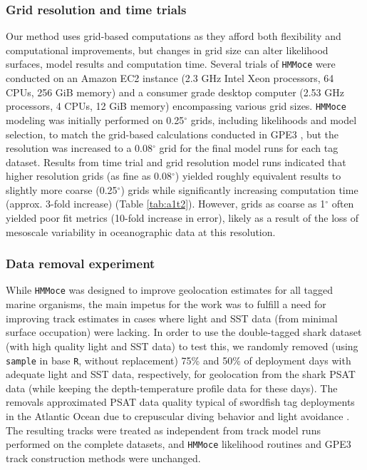 \subsubsection{Grid resolution and time
trials}%

Our method uses grid-based computations as they afford both flexibility and computational improvements, but changes in grid size can alter likelihood surfaces, model results and computation time. Several trials of \texttt{HMMoce} were conducted on an Amazon EC2 instance (2.3 GHz Intel Xeon processors, 64 CPUs, 256 GiB memory) and a consumer grade desktop computer (2.53 GHz processors, 4 CPUs, 12 GiB memory) encompassing various grid sizes. \texttt{HMMoce} modeling was initially performed on 0.25$^{\circ}$ grids, including likelihoods and model selection, to match the grid-based calculations conducted in GPE3 \citep{WC2015}, but the resolution was increased to a 0.08$^{\circ}$ grid for the final model runs for each tag dataset. Results from time trial and grid resolution model runs indicated that higher resolution grids (as fine as 0.08$^{\circ}$) yielded roughly equivalent results to slightly more coarse (0.25$^{\circ}$) grids while significantly increasing computation time (approx. 3-fold increase) (Table \ref{tab:a1t2}). However, grids as coarse as 1$^{\circ}$ often yielded poor fit metrics (10-fold increase in error), likely as a result of the loss of mesoscale variability in oceanographic data at this resolution.

\subsubsection{Data removal experiment}%

While \texttt{HMMoce} was designed to improve geolocation estimates for all tagged marine organisms, the main impetus for the work was to fulfill a need for improving track estimates in cases where light and SST data (from minimal surface occupation) were lacking. In order to use the double-tagged shark dataset (with high quality light and SST data) to test this, we randomly removed (using \texttt{sample} in base \texttt{R}, without replacement) 75\% and 50\% of deployment days with adequate light and SST data, respectively, for geolocation from the shark PSAT data (while keeping the depth-temperature profile data for these days). The removals approximated PSAT data quality typical of swordfish tag deployments in the Atlantic Ocean due to crepuscular diving behavior and light avoidance \citep[][Chapter \ref{chap:2}]{Braun2015, Neilson2009}. The resulting tracks were treated as independent from track model runs performed on the complete datasets, and \texttt{HMMoce} likelihood routines and GPE3 track construction methods were unchanged.

